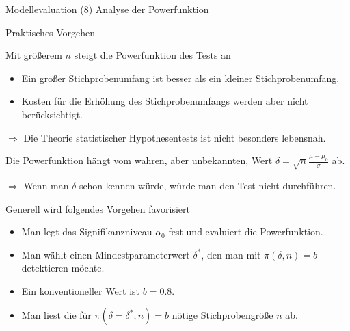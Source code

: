 \documentclass[
  8pt,
  ignorenonframetext,
]{beamer}
\begin{document}
\begin{frame}{Modellevaluation}
\protect\hypertarget{modellevaluation-22}{}
\noindent (8) Analyse der Powerfunktion

Praktisches Vorgehen \small

Mit größerem \(n\) steigt die Powerfunktion des Tests an

\begin{itemize}
\item
  Ein großer Stichprobenumfang ist besser als ein kleiner
  Stichprobenumfang.
\item
  Kosten für die Erhöhung des Stichprobenumfangs werden aber nicht
  berücksichtigt.
\end{itemize}

\(\Rightarrow\) Die Theorie statistischer Hypothesentests ist nicht
besonders lebensnah.

\vspace{1mm}

Die Powerfunktion hängt vom wahren, aber unbekannten, Wert
\(\delta = \sqrt{n}\frac{\mu - \mu_0}{\sigma}\) ab.

\(\Rightarrow\) Wenn man \(\delta\) schon kennen würde, würde man den
Test nicht durchführen.

\vspace{1mm}

Generell wird folgendes Vorgehen favorisiert

\begin{itemize}
\item
  Man legt das Signifikanzniveau \(\alpha_0\) fest und evaluiert die
  Powerfunktion.
\item
  Man wählt einen Mindestparameterwert \(\delta^*\), den man mit
  \(\pi(\delta,n) = b\) detektieren möchte.
\item
  Ein konventioneller Wert ist \(b = 0.8\).
\item
  Man liest die für \(\pi(\delta = \delta^*,n) = b\) nötige
  Stichprobengröße \(n\) ab.
\end{itemize}
\end{frame}
\end{document}
